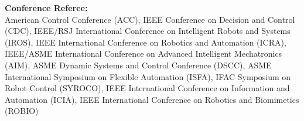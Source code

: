 \documentclass[UTF8,nofonts]{res}
\begin{document}
\begin{resume}

    \textbf{Conference Referee:}\\
    American Control Conference (ACC),
    IEEE Conference on Decision and Control (CDC),
    IEEE/RSJ International Conference on Intelligent Robots and Systems (IROS),
    IEEE International Conference on Robotics and Automation (ICRA),
    IEEE/ASME International Conference on Advanced Intelligent Mechatronics (AIM),
    ASME Dynamic Systems and Control Conference (DSCC),
    ASME International Symposium on Flexible Automation (ISFA),
    IFAC Symposium on Robot Control (SYROCO),
    IEEE International Conference on Information and Automation (ICIA),
    IEEE International Conference on Robotics and Biomimetics (ROBIO)




\end{resume}
\end{document}
